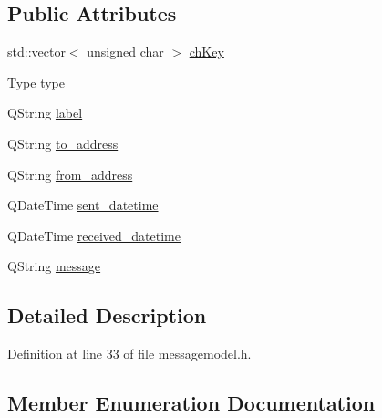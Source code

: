 \subsection*{Public Attributes}
\begin{DoxyCompactItemize}
\item 
std\+::vector$<$ unsigned char $>$ \hyperlink{struct_message_table_entry_a4cd0d26048e5131b597aa5c29656b341}{ch\+Key}
\item 
\hyperlink{struct_message_table_entry_ab7cc6a426fb32f07e97e5b1d86d928e1}{Type} \hyperlink{struct_message_table_entry_a7106560f01940e8ca3c205993984c352}{type}
\item 
Q\+String \hyperlink{struct_message_table_entry_a5415b80eea55bcfa9691b77721ded722}{label}
\item 
Q\+String \hyperlink{struct_message_table_entry_a1c0fe7cf6e729031f5624264e9c4d907}{to\+\_\+address}
\item 
Q\+String \hyperlink{struct_message_table_entry_a0a79ec4e1251c9c2948f02e5dd615089}{from\+\_\+address}
\item 
Q\+Date\+Time \hyperlink{struct_message_table_entry_ac780cbf7059b3a578a728eeb556f262d}{sent\+\_\+datetime}
\item 
Q\+Date\+Time \hyperlink{struct_message_table_entry_a6143e8829e5cc13b77456893161e03aa}{received\+\_\+datetime}
\item 
Q\+String \hyperlink{struct_message_table_entry_a2b795631375fbc3f2e70b78834b2cf49}{message}
\end{DoxyCompactItemize}


\subsection{Detailed Description}


Definition at line 33 of file messagemodel.\+h.



\subsection{Member Enumeration Documentation}
\hypertarget{struct_message_table_entry_ab7cc6a426fb32f07e97e5b1d86d928e1}{}
